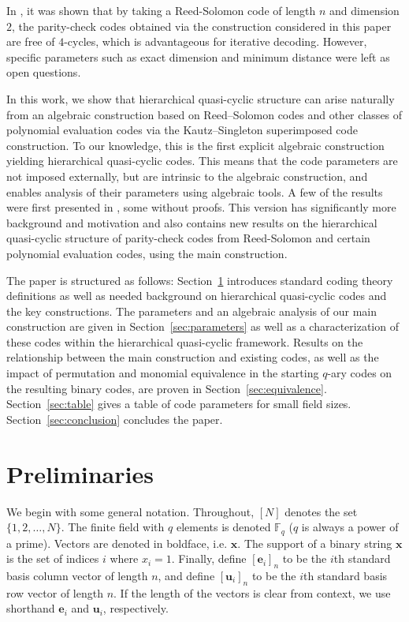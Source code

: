 \documentclass[11pt]{amsart}
\theoremstyle{definition}
\newcommand{\0}{\mathbf{0}}
\begin{document}
In \cite{haymaker2025parity}, it was shown that by taking a Reed-Solomon code of length $n$ and dimension $2$, the parity-check codes obtained via the construction considered in this paper are free of $4$-cycles, which is advantageous for iterative decoding. However, specific parameters such as exact dimension and minimum distance were left as open questions. 

In this work, we show that hierarchical quasi-cyclic structure can arise naturally from an algebraic construction based on Reed–Solomon codes and other classes of polynomial evaluation codes via the Kautz–Singleton superimposed code construction. To our knowledge, this is the first explicit algebraic construction yielding hierarchical quasi-cyclic codes. This means that the code parameters are not imposed externally, but are intrinsic to the algebraic construction, and enables analysis of their parameters using algebraic tools. A few of the results were first presented in \cite{HM25}, some without proofs. This version has significantly more background and motivation and also contains new results on the hierarchical quasi-cyclic structure of parity-check codes from Reed-Solomon and certain polynomial evaluation codes, using the main construction. 

The paper is structured as follows: Section~\ref{sec:prelim} introduces standard coding theory definitions as well as needed background on hierarchical quasi-cyclic codes and the key constructions. The parameters and an algebraic analysis of our main construction are given in Section~\ref{sec:parameters} as well as a characterization of these codes within the hierarchical quasi-cyclic framework. Results on the relationship between the main construction and existing codes, as well as the impact of permutation and monomial equivalence in the starting $q$-ary codes on the resulting binary codes, are proven in Section~\ref{sec:equivalence}. Section~\ref{sec:table} gives a table of code parameters for small field sizes. Section~\ref{sec:conclusion} concludes the paper.

\section{Preliminaries} 
\label{sec:prelim}

We begin with some general notation. Throughout, $[N]$ denotes the set $\{1, 2, \dotsc, N\}$. The finite field with $q$ elements is denoted $\mathbb{F}_q$ ($q$ is always a power of a prime). Vectors are denoted in boldface, i.e. $\mathbf{x}$. The support of a binary string $\mathbf{x}$ is the set of indices $i$ where $x_i=1$.  Finally, define $[\mathbf{e}_i]_n$ to be the $i$th standard basis column vector of length $n$, and define $[\mathbf{u}_i]_n$ to be the $i$th standard basis row vector of length $n$. If the length of the vectors is clear from context, we use shorthand $\mathbf{e}_i$ and $\mathbf{u}_i$, respectively. 
\end{document}
